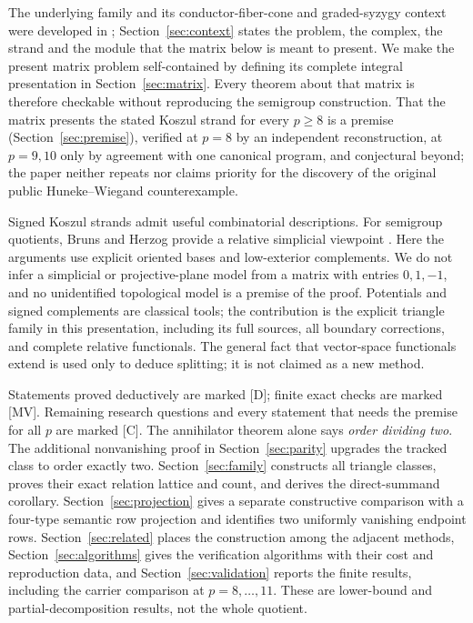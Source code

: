 \documentclass[11pt]{article}
\theoremstyle{definition}
\theoremstyle{remark}
\begin{document}
The underlying family and its conductor-fiber-cone and graded-syzygy context
were developed in \cite{CAOSMain}; Section~\ref{sec:context} states the problem,
the complex, the strand and the module that the matrix below is meant to
present. We make the present matrix problem self-contained by defining its
complete integral presentation in Section~\ref{sec:matrix}. Every theorem about
that matrix is therefore checkable without reproducing the semigroup
construction. That the matrix presents the stated Koszul strand for every
$p\geq8$ is a premise (Section~\ref{sec:premise}), verified at $p=8$ by an
independent reconstruction, at $p=9,10$ only by agreement with one canonical
program, and conjectural beyond; the paper neither repeats nor
claims priority for the discovery of the original public Huneke--Wiegand
counterexample.

Signed Koszul strands admit useful combinatorial descriptions. For semigroup
quotients, Bruns and Herzog provide a relative simplicial viewpoint
\cite{BrunsHerzog}. Here the arguments use explicit oriented bases and
low-exterior complements. We do not infer a simplicial or projective-plane
model from a matrix with entries $0,1,-1$, and no unidentified topological
model is a premise of the proof. Potentials and signed complements are
classical tools; the contribution is the explicit triangle family in this
presentation, including its full sources, all boundary corrections, and
complete relative functionals. The general fact that vector-space functionals
extend is used only to deduce splitting; it is not claimed as a new method.

Statements proved deductively are marked [D]; finite exact checks are marked
[MV]. Remaining research questions and every statement that needs the premise
for all $p$ are marked [C]. The annihilator theorem
alone says \emph{order dividing two}. The additional nonvanishing proof in
Section~\ref{sec:parity} upgrades the tracked class to order exactly two.
Section~\ref{sec:family} constructs all triangle classes, proves their exact
relation lattice and count, and derives the direct-summand corollary.
Section~\ref{sec:projection} gives a separate constructive comparison with a
four-type semantic row projection and identifies two uniformly vanishing
endpoint rows. Section~\ref{sec:related} places the construction among the
adjacent methods, Section~\ref{sec:algorithms} gives the verification
algorithms with their cost and reproduction data, and
Section~\ref{sec:validation} reports the finite results, including the carrier
comparison at $p=8,\ldots,11$.
These are lower-bound and partial-decomposition results, not the whole quotient.
\end{document}
